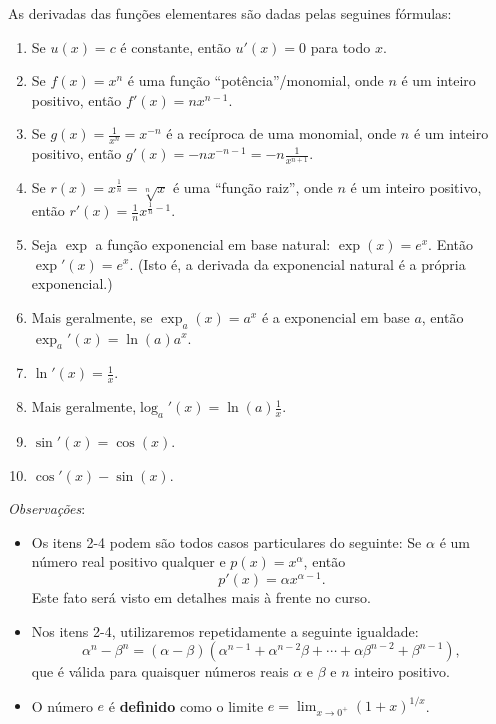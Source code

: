\begin{theorem}
	As derivadas das funções elementares são dadas pelas seguines fórmulas:
	\begin{enumerate}
		\item Se $u(x)=c$ é constante, então $u'(x)=0$ para todo $x$.
		\item Se $f(x)=x^n$ é uma função ``potência''/monomial, onde $n$ é um inteiro positivo, então $f'(x)=nx^{n-1}$.
		\item Se $g(x)=\frac{1}{x^n}=x^{-n}$ é a recíproca de uma monomial, onde $n$ é um inteiro positivo, então $g'(x)=-nx^{-n-1}=-n\frac{1}{x^{n+1}}$.
		\item Se $r(x)=x^{\frac{1}{n}}=\sqrt[n]{x}$ é uma ``função raiz'', onde $n$ é um inteiro positivo, então $r'(x)=\frac{1}{n}x^{\frac{1}{n}-1}$.
		\item Seja $\exp$ a função exponencial em base natural: $\exp(x)=e^x$. Então $\exp'(x)=e^x$. (Isto é, a derivada da exponencial natural é a própria exponencial.)
		\item Mais geralmente, se $\exp_a(x)=a^x$ é a exponencial em base $a$, então $\exp_a'(x)=\ln(a)a^x$.
		\item $\ln'(x)=\frac{1}{x}$.
		\item Mais geralmente,$\log_a'(x)=\ln(a)\frac{1}{x}$.
		\item $\sin'(x)=\cos(x)$.
		\item $\cos'(x)-\sin(x)$.
	\end{enumerate}
\end{theorem}

\textit{Observações}:
\begin{itemize}
	\item Os itens 2-4 podem são todos casos particulares do seguinte: Se $\alpha$ é um número real positivo qualquer e $p(x)=x^\alpha$, então
	\[p'(x)=\alpha x^{\alpha-1}.\]
	Este fato será visto em detalhes mais à frente no curso.
	\item Nos itens 2-4, utilizaremos repetidamente a seguinte igualdade:
	\[\alpha^n-\beta^n=(\alpha-\beta)\left(\alpha^{n-1}+\alpha^{n-2}\beta+\cdots+\alpha\beta^{n-2}+\beta^{n-1}\right),\tag{$*$}\]
	que é válida para quaisquer números reais $\alpha$ e $\beta$ e $n$ inteiro positivo.
	\item O número $e$ é \textbf{definido} como o limite $e=\lim_{x\to 0^+}\left(1+x\right)^{1/x}$.
\end{itemize}


